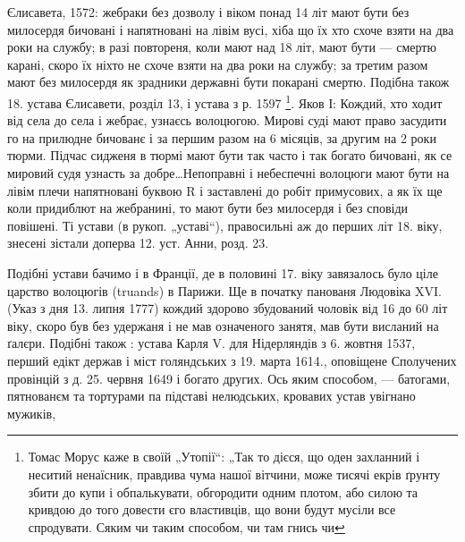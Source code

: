 Єлисавета, 1572: жебраки без дозволу і віком понад 14 літ мают бути без милосердя бичовані і
напятновані на лівім вусі, хіба що їх хто схоче взяти на два роки на службу; в разі повтореня, коли
мают над 18 літ, мают бути — смертю карані, скоро їх ніхто не схоче взяти на два роки на службу; за
третим разом мают без милосердя як зрадники державні бути покарані смертю. Подібна також 18. устава
Єлисавети, розділ 13, і устава з р. 1597 \footnote{
Томас Морус каже в своїй „Утопії“: „Так то дієся, що оден захланний і неситий ненаїсник,
правдива чума нашої вітчини, може тисячі екрів ґрунту збити до купи і обпалькувати, обгородити одним
плотом, або силою та кривдою до того довести єго властивців, що вони будут мусіли все спродувати.
Сяким чи таким способом, чи там гнись чи
}.
Яков І: Кождий, хто ходит від села до села і жебрає,
узнаєсь волоцюгою. Мирові суді мают право засудити го на
прилюдне бичованє і за першим разом на 6 місяців, за
другим на 2 роки тюрми. Підчас сидженя в тюрмі мают
бути так часто і так богато бичовані, як се мировий судя
узнасть за добре\dots Непоправні і небеспечні волоцюги мают
бути на лівім плечи напятновані буквою R і заставлені до
робіт примусових, а як їх ще коли придиблют на жебранині,
то мают бути без милосердя і без сповіди повішені. Ті устави
(в рукоп. „уставі“), правосильні аж до перших літ 18. віку,
знесені зістали доперва 12. уст. Анни, розд. 23.

Подібні устави бачимо і в Франції, де в половині 17.
віку завязалось було ціле царство волоцюгів (truands) в Парижи.
Ще в початку панованя Людовіка XVI. (Указ з дня
13. липня 1777) кождий здорово збудований чоловік від 16
до 60 літ віку, скоро був без удержаня і не мав означеного
занятя, мав бути висланий на ґалєри. Подібні також : устава
Карля V. для Нідерляндів з 6. жовтня 1537, перший едікт
держав і міст голяндських з 19. марта 1614., оповіщене Сполучених
провінцій з д. 25. червня 1649 і богато других.
Ось яким способом, — батогами, пятнованєм та тортурами
па підставі нелюдських, кровавих устав увігнано мужиків,

